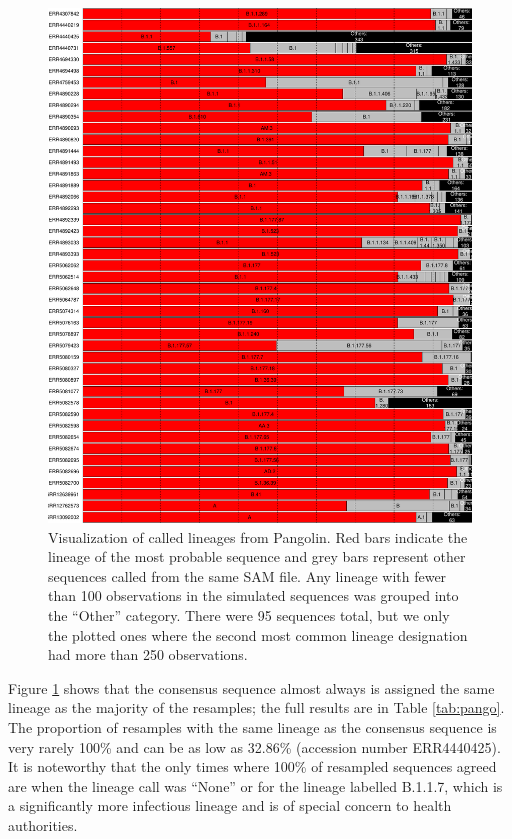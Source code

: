 \documentclass[10pt]{article}
\begin{document}
\begin{figure}
\includegraphics[width=\textwidth]{figs/sampled_bars.pdf}

\caption{\label{fig:covidcalls}Visualization of called lineages from Pangolin.
Red bars indicate the lineage of the most probable sequence and grey bars represent other sequences called from the same SAM file.
Any lineage with fewer than 100 observations in the simulated sequences was grouped into the ``Other'' category.
There were 95 sequences total, but we only the plotted ones where the second most common lineage designation had more than 250 observations. }
\end{figure}


Figure \ref{fig:covidcalls} shows that the consensus sequence almost always is assigned the same lineage as the majority of the resamples; the full results are in Table \ref{tab:pango}.
The proportion of resamples with the same lineage as the consensus sequence is very rarely 100\% and can be as low as 32.86\% (accession number ERR4440425).
It is noteworthy that the only times where 100\% of resampled sequences agreed are when the lineage call was ``None'' or for the lineage labelled B.1.1.7, which is a significantly more infectious lineage and is of special concern to health authorities. 
\end{document}
